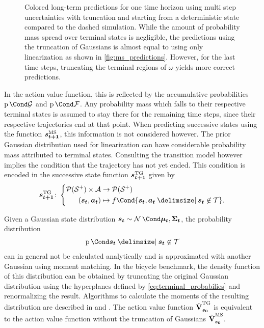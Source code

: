 \begin{figure}[t]
    \centering
    \caption[Long-term predictions using multi step uncertainties with truncation]{
        Colored long-term predictions for one time horizon using multi step uncertainties with truncation and starting from a deterministic state compared to the dashed simulation.
        While the amount of probability mass spread over terminal states is negligible, the predictions using the truncation of Gaussians is almost equal to using only linearization as shown in \cref{fig:ms_predictions}.
        However, for the last time steps, truncating the terminal regions of $\omega$ yields more correct predictions.
    }
    \label{fig:ms_truncation_predictions}
\end{figure}
In the action value function, this is reflected by the accumulative probabilities $\Prob{\PGoal}$ and $\Prob{\PFallen}$.
Any probability mass which falls to their respective terminal states is assumed to stay there for the remaining time steps, since their respective trajectories end at that point.
When predicting successive states using the function $\bm{s_{t+1}}^{\text{MS}}$, this information is not considered however.
The prior Gaussian distribution used for linearization can have considerable probability mass attributed to terminal states.
Consulting the transition model however implies the condition that the trajectory has not yet ended.
This condition is encoded in the successive state function $\bm{s_{t+1}}^{\text{TG}}$ given by
\begin{align}
    \tg{\mat{s_{t+1}}} \colon \left\{
        \begin{aligned}
            \Dists(\Es^+) \times \Ah &\to \Dists(\Es^+) \\
            (\rv{s_t}, \mat{a_t}) &\mapsto f\Cond{\rv{s_t}, \mat{a_t} \given \rv{s_t} \not\in \Tee}.
    \end{aligned}
    \right.
\end{align}

Given a Gaussian state distribution $\rv{s_t} \sim \Gaussian{\mat{\mu_t}, \mat{\Sigma_t}}$, the probability distribution
\begin{align}
    \Prob{\rv{s_t} \given \rv{s_t} \not\in\Tee}
\end{align}
can in general not be calculated analytically and is approximated with another Gaussian using moment matching.
In the bicycle benchmark, the density function of this distribution can be obtained by truncating the original Gaussian distribution using the hyperplanes defined by \cref{eq:terminal_probabilies} and renormalizing the result.
Algorithms to calculate the moments of the resulting distribution are described in \cite{herbrich_gaussian_2005} and \cite{toussaint_technical_2009}.
The action value function $\operatorname{\hat{\operatorname{\mathbf{V}}}}^{\text{TG}}_{\bm{s_0}}$ is equivalent to the action value function without the truncation of Gaussians $\operatorname{\hat{\operatorname{\mathbf{V}}}}^{\text{MS}}_{\bm{s_0}}$.

